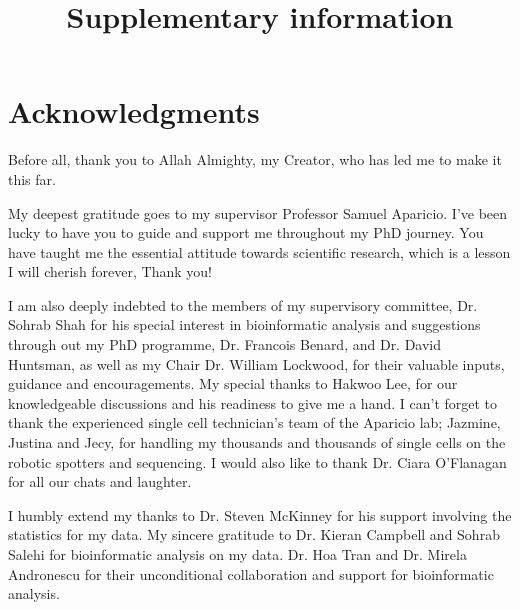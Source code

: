 

\makeatletter
\newcommand{\putFigLargCap}[5]
{
\begin{center}
\texttt{[image: \#1]}   
\bigskip
\setbox0\vbox{
\let\caption@rule\relax
\captionof{figure}[#5]{\textbf{#5} #3 \label{#4}}
\global\skip1\lastskip\unskip
\global\setbox1\lastbox

}
\unvbox0
\setbox0\hbox{\unhbox1\unskip\unskip\unpenalty
\global\setbox1\lastbox}
\unvbox1
\vskip\skip1
\end{center}
}
\makeatother





\title{Supplementary information}















\chapter{Acknowledgments}

Before all, thank you to Allah Almighty, my Creator, who has led me to make it this far.

My deepest gratitude goes to my supervisor Professor Samuel Aparicio. I've been lucky to have you to guide and support me throughout my PhD journey. You have taught me the essential attitude towards scientific research, which is a lesson I will cherish forever, Thank you!

I am also deeply indebted to the members of my supervisory committee, Dr. Sohrab Shah for his special interest in bioinformatic analysis and suggestions through out my PhD programme, Dr. Francois Benard, and Dr. David Huntsman, as well as my Chair Dr. William Lockwood, for their valuable inputs, guidance and encouragements. My special thanks to Hakwoo Lee, for our knowledgeable discussions and his readiness to give me a hand. I can't forget to thank the experienced single cell technician's team of the Aparicio lab; Jazmine, Justina and Jecy, for handling my thousands and thousands of single cells on the robotic spotters and sequencing. I would also like to thank Dr. Ciara O'Flanagan for all our chats and laughter. 

I humbly extend my thanks to Dr. Steven McKinney for his support involving the statistics for my data. My sincere gratitude to Dr. Kieran Campbell and Sohrab Salehi for bioinformatic analysis on my data. Dr. Hoa Tran and Dr. Mirela Andronescu for their unconditional collaboration and support for bioinformatic analysis. 

